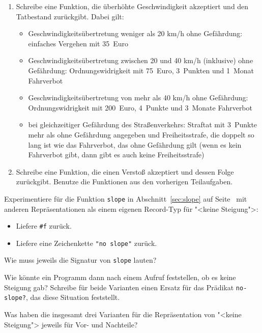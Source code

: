 \begin{aufgabe}
\begin{enumerate}
  \item Schreibe eine Funktion, die überhöhte
    Geschwindigkeit akzeptiert und den Tatbestand zurückgibt.  Dabei
    gilt:
    \begin{itemize}
    \item Geschwindigkeitsübertretung weniger als 20 km/h ohne Gefährdung:
      einfaches Vergehen mit 35~Euro
    \item Geschwindigkeitsübertretung zwischen 20 und 40 km/h
      (inklusive) ohne Gefährdung: Ordnungswidrigkeit mit 75~Euro,
      3~Punkten und 1~Monat Fahrverbot
    \item Geschwindigkeitsübertretung von mehr als 40 km/h ohne
      Gefährdung: Ordnungswidrigkeit mit 200~Euro, 4~Punkte und
      3~Monate Fahrverbot
    \item bei gleichzeitiger Gefährdung des Straßenverkehrs: Straftat
      mit 3~Punkte mehr als ohne Gefährdung angegeben und
      Freiheitsstrafe, die doppelt so lang ist wie das Fahrverbot, das
      ohne Gefährdung gilt (wenn es kein Fahrverbot gibt, dann gibt es
      auch keine Freiheitsstrafe)
    \end{itemize}

  \item Schreibe eine Funktion, die einen
    Verstoß akzeptiert und dessen Folge zurückgibt.  Benutze die
    Funktionen aus den vorherigen Teilaufgaben.
  \end{enumerate}
\end{aufgabe}

\begin{aufgabe}\label{aufgabe:no-slope}
  Experimentiere für die Funktion \lstinline{slope} in
  Abschnitt~\ref{sec:slope} auf Seite~\pageref{sec:slope}
  mit anderen Repräsentationen als einem eigenen
  Record-Typ für "<keine Steigung">:
  \begin{itemize}
  \item Liefere \lstinline{#f} zurück.
  \item Liefere eine Zeichenkette \lstinline{"no slope"} zurück.
  \end{itemize}
  Wie muss jeweils die Signatur von \lstinline{slope} lauten?
  
  Wie könnte ein Programm dann nach einem Aufruf feststellen, ob es
  keine Steigung gab?  Schreibe für beide Varianten einen Ersatz für das Prädikat
  \lstinline{no-slope?}, das diese Situation feststellt.

  Was haben die insgesamt drei Varianten für die Repräsentation von
  "<keine Steigung"> jeweils für Vor- und Nachteile?
\end{aufgabe}

